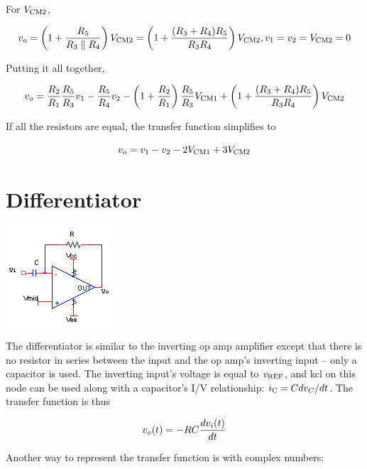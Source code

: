 \noindent For $V_\mathrm{CM2}$,

\begin{equation}
v_o = \left(1+\frac{R_5}{R_3 \parallel R_4}\right)V_\mathrm{CM2} = \left(1+\frac{(R_3+R_4)R_5}{R_3R_4}\right)V_\mathrm{CM2}, v_1 = v_2 = V_\mathrm{CM2} = 0
\end{equation}

\noindent Putting it all together,

\textcolor{red}{
\begin{equation}
v_o = \frac{R_2}{R_1}\frac{R_5}{R_3}v_1 - \frac{R_5}{R_4}v_2 - \left(1+\frac{R_2}{R_1}\right)\frac{R_5}{R_3}V_\mathrm{CM1} + \left(1+\frac{(R_3+R_4)R_5}{R_3R_4}\right)V_\mathrm{CM2}
\label{eq:highcmdifferenceamplifier}
\end{equation}
}

\noindent If all the resistors are equal, the transfer function simplifies to

\textcolor{red}{
\begin{equation}
v_o = v_1-v_2-2V_\mathrm{CM1}+3V_\mathrm{CM2}
\label{eq:highcmdifferenceamplifier_simple}
\end{equation}
}

\section{Differentiator}
\begin{center}
	\includegraphics{schematics/differentiator.PNG}
\end{center}
The differentiator is similar to the inverting op amp amplifier except that there is no resistor in series between the input and the op amp's inverting input -- only a capacitor is used.
The inverting input's voltage is equal to $v_\mathrm{REF}$, and \ac{kcl} on this node can be used along with a capacitor's I/V relationship: $i_\mathrm{C} = Cdv_C/dt$. The transfer function is thus

\textcolor{red}{
\begin{equation}
v_o(t) = -RC\frac{dv_i(t)}{dt}
\label{differentiator}
\end{equation}
}

\noindent Another way to represent the transfer function is with complex numbers:

